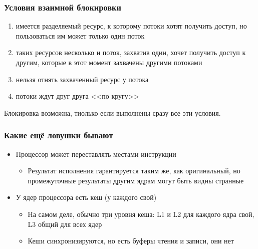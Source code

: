 \documentclass[xetex,mathserif,serif]{beamer}
\begin{document}
    \begin{frame}
        \frametitle{Условия взаимной блокировки}
        \begin{enumerate}
            \item имеется разделяемый ресурс, к которому потоки хотят получить доступ, но пользоваться им может только один поток
            \item таких ресурсов несколько и поток, захватив один, хочет получить доступ к другим, которые в этот момент захвачены другими потоками
            \item нельзя отнять захваченный ресурс у потока
            \item потоки ждут друг друга <<по кругу>>
        \end{enumerate}
        Блокировка возможна, тиолько если выполнены сразу все эти условия.
    \end{frame}

    \begin{frame}
        \frametitle{Какие ещё ловушки бывают}
        \begin{itemize}
            \item Процессор может переставлять местами инструкции
            \begin{itemize}
                \item Результат исполнения гарантируется таким же, как оригинальный, но промежуточные результаты другим 
                    ядрам могут быть видны странные
            \end{itemize}
            \item У ядер процессора есть кеш (у каждого свой)
            \begin{itemize}
                \item На самом деле, обычно три уровня кеша: L1 и L2 для каждого ядра свой, L3 общий для всех ядер
                \item Кеши синхронизируются, но есть буферы чтения и записи, они нет
            \end{itemize}
        \end{itemize}
    \end{frame}
\end{document}
